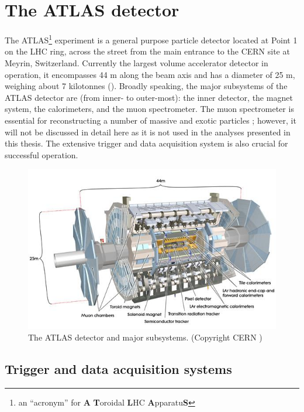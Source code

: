 \section{The ATLAS detector}
\label{sec:atlas}

The ATLAS\footnote{an ``acronym'' for \textbf{A} \textbf{T}oroidal \textbf{L}HC \textbf{A}pparatu\textbf{S}} experiment is a general purpose particle detector \cite{Aad:2008zzm} located at Point 1 on the LHC ring, across the street from the main entrance to the CERN site at Meyrin, Switzerland.
Currently the largest volume accelerator detector in operation, it encompasses 44 m along the beam axis and has a diameter of 25 m, weighing about 7 kilotonnes ().
Broadly speaking, the major subsystems of the ATLAS detector are (from inner- to outer-most): the inner detector, the magnet system, the calorimeters, and the muon spectrometer.
The muon spectrometer is essential for reconstructing a number of massive and exotic particles \cite{ATLAS:1997ad}; however, it will not be discussed in detail here as it is not used in the analyses presented in this thesis.
The extensive trigger and data acquisition system is also crucial for successful operation. %


\begin{figure}[t]
\includegraphics{ATLAS_layout.jpg}
\caption{The ATLAS detector and major subsystems. (Copyright CERN \cite{Pequenao:1095924})}
\label{fig:atlas_layout}
\end{figure}


\subsection{Trigger and data acquisition systems}
\label{subsec:atlas_trigger}

